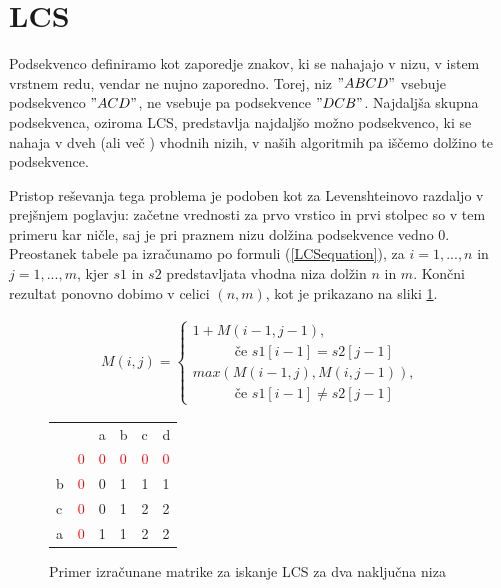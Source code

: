 \documentclass[a4paper,12pt,openright]{book}
\begin{document}
\section{LCS}

Podsekvenco definiramo kot zaporedje znakov, ki se nahajajo v nizu, v istem vrstnem redu, vendar ne nujno zaporedno. Torej, niz $"ABCD"$ vsebuje podsekvenco $"ACD"$, ne vsebuje pa podsekvence $"DCB"$. Najdaljša skupna podsekvenca, oziroma LCS, predstavlja najdaljšo možno podsekvenco, ki se nahaja v dveh (ali več \cite{LCSmultipleSequences}) vhodnih nizih, v naših algoritmih pa iščemo dolžino te podsekvence. 

Pristop reševanja tega problema je podoben kot za Levenshteinovo razdaljo v prejšnjem poglavju: začetne vrednosti za prvo vrstico in prvi stolpec so v tem primeru kar ničle, saj je pri praznem nizu dolžina podsekvence vedno 0. Preostanek tabele pa izračunamo po formuli (\ref{LCSequation}), za $i=1,...,n$ in $j=1,...,m$, kjer $s1$ in $s2$ predstavljata vhodna niza dolžin $n$ in $m$. Končni rezultat ponovno dobimo v celici $(n, m)$, kot je prikazano na sliki \ref{LCSexample}. 

\begin{equation}
\label{LCSequation}
\begin{aligned}
M(i, j) = 
\begin{cases}
     1 + M(i-1, j-1) ,      \\ \quad \quad \quad\text{če } s1[i-1]=s2[j-1]\\
     max(M(i-1, j), M(i, j-1)) , \\ \quad \quad \quad \text{če } s1[i-1] \neq s2[j-1]
  \end{cases}
\end{aligned}
\end{equation}

\bigskip \bigskip

\begin{figure}[htb]
\begin{center}
\begin{tabular}{|l|l|l|l|l|l|}
\cline{3-6}
  \multicolumn{2}{c|}{}  & a & b & c & d\\ \cline{2-6}
 \multicolumn{1}{c|}{} & \textcolor{red}{0} & \textcolor{red}{0} & \textcolor{red}{0} & \textcolor{red}{0} & \textcolor{red}{0}\\ \hline
b  & \textcolor{red}{0} & 0 & \cellcolor{blue!15}1 & 1 & 1\\ \hline
c  & \textcolor{red}{0} & 0 & 1 & \cellcolor{blue!15}2 & \cellcolor{blue!15}2\\ \hline
a  & \textcolor{red}{0} & 1 & 1 & 2 & \cellcolor{blue!25}2 \\ \hline
\end{tabular}
\end{center}
\caption{Primer izračunane matrike za iskanje LCS za dva naključna niza}
\label{LCSexample}
\end{figure}
\end{document}
